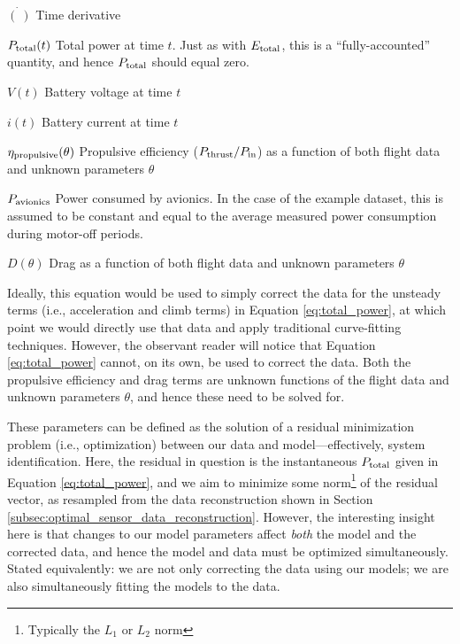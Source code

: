 \documentclass[conf]{new-aiaa}
\begin{document}
    \begin{eqexpl}
        \item {$\dot{(\:)}$} Time derivative
        \item {$P_{\rm total}(t)$} Total power at time $t$. Just as with $E_{\rm total}$, this is a ``fully-accounted'' quantity, and hence $P_{\rm total}$ should equal zero.
        \item {$V(t)$} Battery voltage at time $t$
        \item {$i(t)$} Battery current at time $t$
        \item {$\eta_{\rm propulsive}(\theta)$} Propulsive efficiency ($P_{\rm thrust} / P_{\rm in}$) as a function of both flight data and unknown parameters $\theta$
        \item {$P_{\rm avionics}$} Power consumed by avionics. In the case of the example dataset, this is assumed to be constant and equal to the average measured power consumption during motor-off periods.
        \item {$D(\theta)$} Drag as a function of both flight data and unknown parameters $\theta$
    \end{eqexpl}

    Ideally, this equation would be used to simply correct the data for the unsteady terms (i.e., acceleration and climb terms) in Equation \ref{eq:total_power}, at which point we would directly use that data and apply traditional curve-fitting techniques. However, the observant reader will notice that Equation \ref{eq:total_power} cannot, on its own, be used to correct the data. Both the propulsive efficiency and drag terms are unknown functions of the flight data and unknown parameters $\theta$, and hence these need to be solved for.

    These parameters can be defined as the solution of a residual minimization problem (i.e., optimization) between our data and model—effectively, system identification. Here, the residual in question is the instantaneous $P_{\rm total}$ given in Equation \ref{eq:total_power}, and we aim to minimize some norm\footnote{Typically the $L_1$ or $L_2$ norm} of the residual vector, as resampled from the data reconstruction shown in Section \ref{subsec:optimal_sensor_data_reconstruction}. However, the interesting insight here is that changes to our model parameters affect \emph{both} the model and the corrected data, and hence the model and data must be optimized simultaneously. Stated equivalently: we are not only correcting the data using our models; we are also simultaneously fitting the models to the data.
\end{document}
